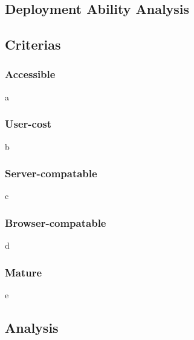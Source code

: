 \begin{CJK}{Bg5}{bsmi}
\section{Deployment Ability Analysis}

\subsection{Criterias}

\subsubsection{Accessible}

a

\subsubsection{User-cost}

b

\subsubsection{Server-compatable}

c

\subsubsection{Browser-compatable}

d

\subsubsection{Mature}

e

\subsection{Analysis}

\begin{comment}
The deployment ability is also an important thing which is need to be considered, especially in designing an authentication system.
A system with high usability means it is friendly to users; a system with high deployment ability means it is friendly to the system provider or, more precise, the developers.
The following paragraph states the criterias I used to estimate a system's deployment ability. 
\end{comment}


\end{CJK}